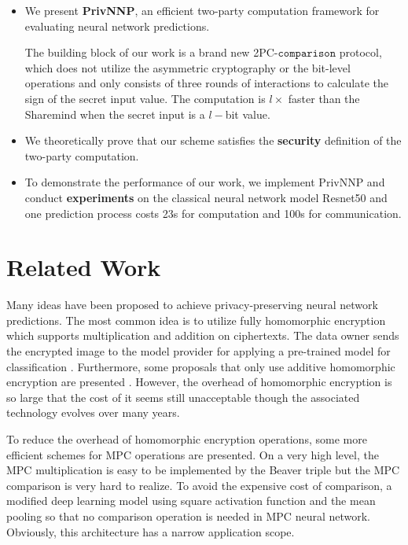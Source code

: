 \documentclass[letterpaper]{article} %
\begin{document}
    \begin{itemize}
        \item We present \textbf{PrivNNP}, an efficient two-party computation framework
        for evaluating neural network predictions.

        The building block of our work is a brand new 2PC-$\mathtt{comparison}$ protocol,
        which does not utilize the asymmetric cryptography or the bit-level operations
        and only consists of three rounds of interactions to calculate the sign of the secret input value.
        The computation is $l\times$ faster than the Sharemind \cite{Sharemind}
        when the secret input is a $l-$bit value.
        \item
        We theoretically prove that our scheme satisfies the
        \textbf{security} definition of the two-party computation.

        \item
        To demonstrate the performance of our work,
        we implement PrivNNP and conduct \textbf{experiments} on the classical
        neural network model Resnet50 and
        one prediction process costs 23s for computation and 100s for communication.

   \end{itemize}

\section{Related Work}
    Many ideas have been proposed to achieve privacy-preserving neural network predictions.
    The most common idea is to utilize fully homomorphic encryption  \cite{SEAL} \cite{Homomorphic1}
    which supports multiplication and addition on ciphertexts.
    The data owner sends the encrypted image to the model provider for applying a pre-trained model for classification \cite{FullyHomomorphic}.
    Furthermore, some proposals that only use additive homomorphic encryption are presented \cite{Homomorphic2}.
    However, the overhead of homomorphic encryption is so large that
    the cost of it seems still unacceptable
    though the associated technology evolves over many years\cite{ObliviousNeuralNetwork}.

    To reduce the overhead of homomorphic encryption operations,
    some more efficient schemes for MPC operations are presented.
    On a very high level, the MPC multiplication is easy to be implemented by the Beaver triple \cite{EfficientMultipartyProtocols}
    but the MPC comparison is very hard to realize.
    To avoid the expensive cost of comparison,
    a modified deep learning model \cite{CryptoNets} using square activation function and the mean pooling so that
    no comparison operation is needed in MPC neural network.
    Obviously, this architecture has a narrow application scope.
\end{document}
